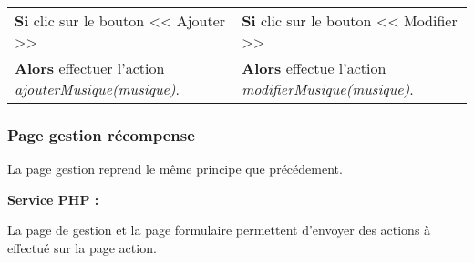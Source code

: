            \begin{center}
                \begin{tabular}{l | l}
                    \textbf{Si} clic sur le bouton << Ajouter >> & \textbf{Si} clic sur le bouton << Modifier >> \\
                    \textbf{Alors} effectuer l'action \emph{ajouterMusique(musique)}. & \textbf{Alors} effectue l'action \emph{modifierMusique(musique)}.
                \end{tabular}
            \end{center}
            
            







            
	\clearpage

		\subsubsection{Page gestion récompense}

			\begin{paragraphe}
                La page gestion reprend le même principe que précédement.
			\end{paragraphe}

			\begin{paragraphe}
				\textbf{Service PHP :}
			\end{paragraphe}
            
            \begin{paragraphe}
                La page de gestion et la page formulaire permettent d'envoyer des actions à effectué sur la page action.
			\end{paragraphe}

